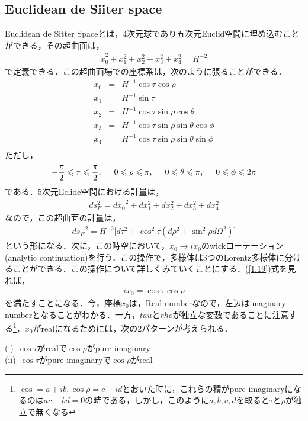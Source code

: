 \subsection{Euclidean de Siiter space}
Euclidean de Sitter Spaceとは，4次元球であり五次元Euclid空間に埋め込むことができる，その超曲面は，
\begin{eqnarray}
  \tilde{x}_0^2+x_1^2+x_2^2+x_3^2+x_4^2=H^{-2}
\end{eqnarray}
で定義できる．この超曲面場での座標系は，次のように張ることができる．
\begin{eqnarray}
  \label{1.19}
  \tilde{x}_0&=&H^{-1}\cos{\tau}\cos{\rho} \\
  \label{test}
  x_1&=&H^{-1}\sin{\tau} \\
  x_2&=&H^{-1}\cos{\tau}\sin{\rho}\cos{\theta} \\
  x_3&=&H^{-1}\cos{\tau}\sin{\rho}\sin{\theta}\cos{\phi} \\
  x_4&=&H^{-1}\cos{\tau}\sin{\rho}\sin{\theta}\sin{\phi} \\
\end{eqnarray}
ただし，
\begin{eqnarray}
  \label{1.25}
  -\frac{\pi}{2} \leqslant \tau \leqslant \frac{\pi}{2},\hspace{0.5cm} 0 \leqslant \rho \leqslant \pi,\hspace{0.5cm} 0 \leqslant \theta \leqslant \pi, \hspace{0.5cm} 0 \leqslant \phi \leqslant 2\pi
\end{eqnarray}
である．5次元Eclide空間における計量は，
\begin{eqnarray}
  ds_{E}^2=d{\tilde{x}_0}^2+dx_1^2+dx_2^2+dx_3^2+dx_4^2
\end{eqnarray}
 なので，この超曲面の計量は，
 \begin{eqnarray}
   \label{4sphereM}
   {ds_{E}}^2=H^{-2}\biggl[d\tau^2 + \cos^2\tau(d\rho^2+\sin^2\rho d\Omega^2)\biggr]
 \end{eqnarray}
 という形になる．次に，この時空において，$\tilde{x}_0\rightarrow ix_{0}$のwickローテーション(analytic continuation)を行う．この操作で，多様体は3つのLorentz多様体に分けることができる．この操作について詳しくみていくことにする．(\ref{1.19})式を見れば，
 \begin{eqnarray}
   ix_0=\cos\tau\cos\rho
 \end{eqnarray}
を満たすことになる．今，座標$x_0$は，Real numberなので，左辺はimaginary numberとなることがわかる．一方，$tau$と$rho$が独立な変数であることに注意する\footnote{$\cos=a+ib,\cos\rho=c+id$とおいた時に，これらの積がpure imaginaryになるのは$ac-bd=0$の時である，しかし，このように$a,b,c,d$を取ると$\tau$と$\rho$が独立で無くなる}，$x_0$がrealになるためには，次の2パターンが考えられる．
\begin{center}
  (i)\ $\cos\tau$がrealで$\cos\rho$がpure imaginary \\
  (ii)\ $\cos\tau$がpure imaginaryで$\cos\rho$がreal
\end{center}

